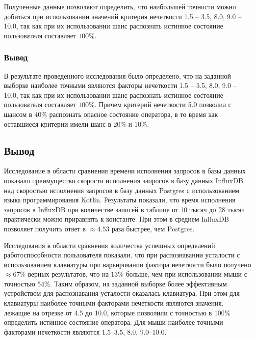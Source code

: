 Полученные данные позволяют определить, что наибольшей точности \newline можно добиться при использовании значений критерия нечеткости 1.5 -- 3.5, 8.0, 9.0 -- 10.0, так как при их использовании шанс распознать истинное состояние пользователя составляет $100\%$.

\subsubsection*{Вывод}
В результате проведенного исследования было определено, что на заданной выборке наиболее точными являются факторы нечеткости 1.5 -- 3.5, 8.0, 9.0 -- 10.0, так как при их использовании шанс распознать истинное состояние пользователя составляет $100\%$. Причем критерий нечеткости 5.0 позволил с шансом в $40\%$ распознать опасное состояние оператора, в то время как оставшиеся критерии имели шанс в $20\%$ и $10\%$.

\subsection*{Вывод}
Исследование в области сравнения времени исполнения запросов в базы данных показало преимущество скорости исполнения запросов в базу данных InfluxDB над скоростью исполнения запросов в базу данных Postgres с использованием языка программирования Kotlin. Результаты показали, что время исполнения запросов в InfluxDB при количестве записей в таблице от 10 тысяч до 28 тысяч практически можно приравнять к константе. При этом в среднем InfluxDB позволяет получить ответ в $\approx 4.53$ раза быстрее, чем Postgres.

Исследования в области сравнения количества успешных определений работоспособности пользователя показали, что при распознавании усталости с использованием клавиатуры при варьировании фактора нечеткости было получено $\approx 67\%$ верных результатов, что на $13\%$ больше, чем при использовании мыши с точностью $54\%$. Таким образом, на заданной выборке более эффективным устройством для распознавания усталости оказалась клавиатура. При этом для клавиатуры наиболее точными факторами нечеткости являются значения, лежащие на отрезке от 4.5 до 10.0, которые позволили с точностью в $100\%$ определить истинное состояние оператора. Для мыши наиболее точными факторами нечеткости являются 1.5--3.5, 8.0, 9.0--10.0.

\pagebreak